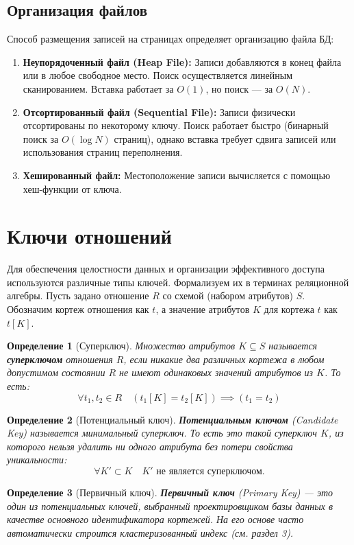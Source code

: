 \documentclass[12pt, a4paper]{article}
\newtheorem{definition}{Определение}
\begin{document}
\subsection{Организация файлов}
Способ размещения записей на страницах определяет организацию файла БД:
\begin{enumerate}
    \item \textbf{Неупорядоченный файл (Heap File):} Записи добавляются в конец файла или в любое свободное место. Поиск осуществляется линейным сканированием. Вставка работает за $O(1)$, но поиск --- за $O(N)$.
    \item \textbf{Отсортированный файл (Sequential File):} Записи физически отсортированы по некоторому ключу. Поиск работает быстро (бинарный поиск за $O(\log N)$ страниц), однако вставка требует сдвига записей или использования страниц переполнения.
    \item \textbf{Хешированный файл:} Местоположение записи вычисляется с помощью хеш-функции от ключа.
\end{enumerate}

\section{Ключи отношений}

Для обеспечения целостности данных и организации эффективного доступа используются различные типы ключей. Формализуем их в терминах реляционной алгебры. Пусть задано отношение $R$ со схемой (набором атрибутов) $S$. Обозначим кортеж отношения как $t$, а значение атрибутов $K$ для кортежа $t$ как $t[K]$.

\begin{definition}[Суперключ]
Множество атрибутов $K \subseteq S$ называется \textbf{суперключом} отношения $R$, если никакие два различных кортежа в любом допустимом состоянии $R$ не имеют одинаковых значений атрибутов из $K$. То есть:
\[
\forall t_1, t_2 \in R \quad (t_1[K] = t_2[K]) \implies (t_1 = t_2)
\]
\end{definition}

\begin{definition}[Потенциальный ключ]
\textbf{Потенциальным ключом} (Candidate Key) называется минимальный суперключ. То есть это такой суперключ $K$, из которого нельзя удалить ни одного атрибута без потери свойства уникальности:
\[
\forall K' \subset K \quad K' \text{ не является суперключом}.
\]
\end{definition}

\begin{definition}[Первичный ключ]
\textbf{Первичный ключ} (Primary Key) --- это один из потенциальных ключей, выбранный проектировщиком базы данных в качестве основного идентификатора кортежей. На его основе часто автоматически строится кластеризованный индекс (см. раздел 3).
\end{definition}
\end{document}

